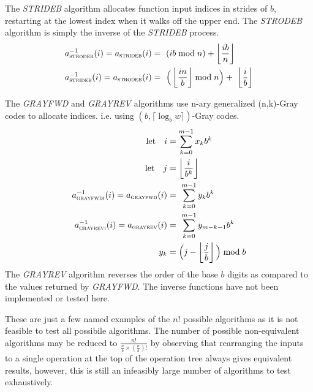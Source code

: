 \documentclass[11pt,twoside]{article}
\begin{document}
The \textit{STRIDEB} algorithm allocates function input indices in strides of
$b$, restarting at the lowest index when it walks off the upper end.
The \textit{STRODEB} algorithm is simply the inverse of the \textit{STRIDEB}
process.
\begin{align}
\label{eq:a_stride}
a_{\textsc{strodeb}}^{-1}(i) = a_{\textsc{strideb}}(i) &= \
    (ib \bmod n) + \left\lfloor \frac{ib}{n} \right\rfloor \\
\label{eq:a_strode}
a_{\textsc{strideb}}^{-1}(i) = a_{\textsc{strodeb}}(i) &= \
    \Big( \left\lfloor \frac{in}{b} \right\rfloor \bmod n \Big) + \
    \left\lfloor \frac{i}{b} \right\rfloor
\end{align}

The \textit{GRAYFWD} and \textit{GRAYREV} algorithms use n-ary generalized
(n,k)-Gray codes to allocate indices. i.e. using
$(b, \lceil\log_bw\rceil)$-Gray codes.
\begin{align}
\text{let}\quad i &= \sum\limits_{k = 0}^{m-1} x_k b^k \\
\text{let}\quad j &= \left\lfloor \frac{i}{b^k} \right\rfloor \\
\label{eq:a_grayfwd}
a_{\textsc{grayfwdi}}^{-1}(i) = a_{\textsc{grayfwd}}(i) &= \
    \sum\limits_{k = 0}^{m-1} y_k b^k \\
\label{eq:a_grayrev}
a_{\textsc{grayrevi}}^{-1}(i) = a_{\textsc{grayrev}}(i) &=  \
    \sum\limits_{k = 0}^{m-1} y_{m-k-1} b^k \\
y_k &= \Big( j - \left\lfloor \frac{j}{b} \right\rfloor \Big) \bmod b
\end{align}
The \textit{GRAYREV} algorithm reverses the order of the base $b$ digits as
compared to the values returned by \textit{GRAYFWD}.
The inverse functions have not been implemented or tested here.

These are just a few named examples of the $n!$ possible algorithms as it is
not feasible to test all possibile algorithms.
The number of possible non-equivalent algorithms may be reduced to
$\frac{n!}{\frac{n}{b} \times (\frac{n}{b})!}$ by observing that
rearranging the inputs to a single operation at the top of the operation tree
always gives equivalent results, however, this is still an infeasibly large
number of algorithms to test exhaustively.

\clearpage
\end{document}
